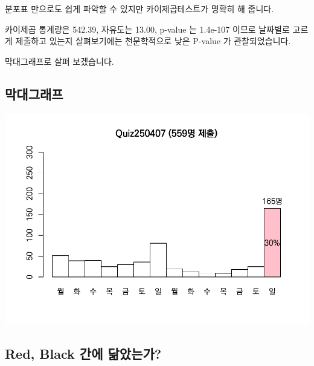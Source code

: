 \documentclass[
]{book}
\begin{document}
분포표 만으로도 쉽게 파악할 수 있지만 카이제곱테스트가 명확히 해 줍니다.

카이제곱 통계량은 542.39, 자유도는 13.00, p-value 는 1.4e-107 이므로 날짜별로 고르게 제출하고 있는지 살펴보기에는 천문학적으로 낮은 P-value 가 관찰되었습니다.

막대그래프로 살펴 보겠습니다.

\subsection{막대그래프}\label{uxb9c9uxb300uxadf8uxb798uxd504-6}

\includegraphics{Quiz_report_2025_files/figure-latex/unnamed-chunk-165-1.pdf}

\subsection{Red, Black 간에 닮았는가?}\label{red-black-uxac04uxc5d0-uxb2eeuxc558uxb294uxac00-5}
\end{document}
